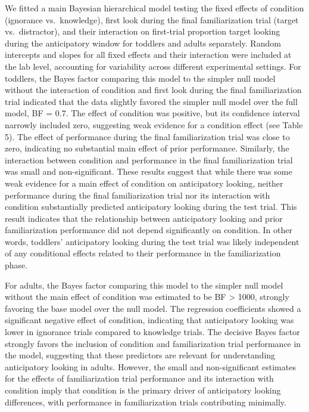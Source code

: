 \documentclass[
  man,floatsintext]{apa6}
\begin{document}
We fitted a main Bayesian hierarchical model testing the fixed effects of condition (ignorance vs.~knowledge), first look during the final familiarization trial (target vs.~distractor), and their interaction on first-trial proportion target looking during the anticipatory window for toddlers and adults separately. Random intercepts and slopes for all fixed effects and their interaction were included at the lab level, accounting for variability across different experimental settings.
For toddlers, the Bayes factor comparing this model to the simpler null model without the interaction of condition and first look during the final familiarization trial indicated that the data slightly favored the simpler null model over the full model, BF = 0.7. The effect of condition was positive, but its confidence interval narrowly included zero, suggesting weak evidence for a condition effect (see Table 5). The effect of performance during the final familiarization trial was close to zero, indicating no substantial main effect of prior performance. Similarly, the interaction between condition and performance in the final familiarization trial was small and non-significant. These results suggest that while there was some weak evidence for a main effect of condition on anticipatory looking, neither performance during the final familiarization trial nor its interaction with condition substantially predicted anticipatory looking during the test trial. This result indicates that the relationship between anticipatory looking and prior familiarization performance did not depend significantly on condition. In other words, toddlers' anticipatory looking during the test trial was likely independent of any conditional effects related to their performance in the familiarization phase.

For adults, the Bayes factor comparing this model to the simpler null model without the main effect of condition was estimated to be BF \textgreater{} 1000, strongly favoring the base model over the null model. The regression coefficients showed a significant negative effect of condition, indicating that anticipatory looking was lower in ignorance trials compared to knowledge trials. The decisive Bayes factor strongly favors the inclusion of condition and familiarization trial performance in the model, suggesting that these predictors are relevant for understanding anticipatory looking in adults. However, the small and non-significant estimates for the effects of familiarization trial performance and its interaction with condition imply that condition is the primary driver of anticipatory looking differences, with performance in familiarization trials contributing minimally.
\end{document}
